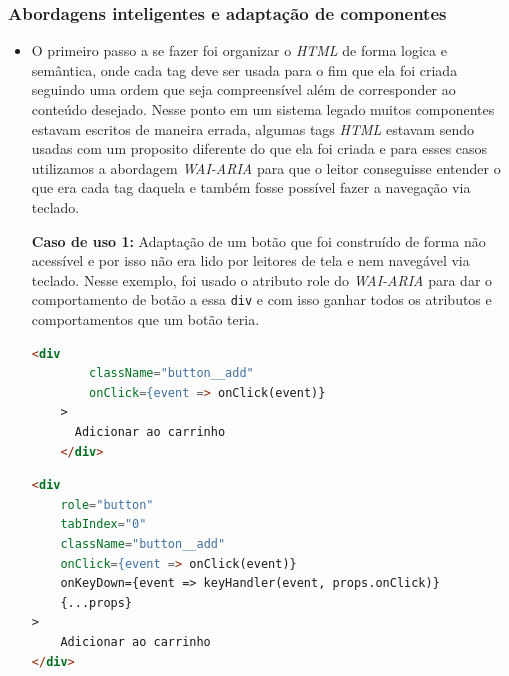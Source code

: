 \subsubsection{Abordagens inteligentes e adaptação de componentes}
{\begin{itemize}
    \item O primeiro passo a se fazer foi organizar o \textit{HTML} \cite{HTML} de forma logica e semântica, onde cada tag deve ser usada para o fim que ela foi criada seguindo uma ordem que seja compreensível além de corresponder ao conteúdo desejado. Nesse ponto em um sistema legado muitos componentes estavam escritos de maneira errada, algumas tags \textit{HTML} \cite{HTML} estavam sendo usadas com um proposito diferente do que ela foi criada e para esses casos utilizamos a abordagem \textit{WAI-ARIA} \cite{WAI-ARIA} para que o leitor conseguisse entender o que era cada tag daquela e também fosse possível fazer a navegação via teclado.


{\textbf{Caso de uso 1:} Adaptação de um botão que foi construído de forma não acessível e por isso não era lido por leitores de tela e nem navegável via teclado. Nesse exemplo, foi usado o atributo role do \textit{WAI-ARIA}\cite{WAI-ARIA} para dar o comportamento de botão a essa \lstinline{div} e com isso ganhar todos os atributos e comportamentos que um botão teria.

\begin{lstlisting}[language=html, caption=Componente de botão antes de receber boas praticas e acessibilidade]
    <div
        className="button__add"
        onClick={event => onClick(event)}
    >
      Adicionar ao carrinho 
    </div>
\end{lstlisting}}
{\begin{lstlisting}[language=html,caption=Adaptação do componente de botão usando \textit{WAI-ARIA}]
<div 
    role="button" 
    tabIndex="0" 
    className="button__add"
    onClick={event => onClick(event)}
    onKeyDown={event => keyHandler(event, props.onClick)}
    {...props}
>
    Adicionar ao carrinho
</div>
 
\end{lstlisting}}


\end{itemize}}
